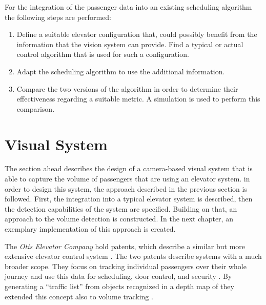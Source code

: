 For the integration of the passenger data into an existing scheduling algorithm the following steps are performed:

\begin{enumerate}
    \item Define a suitable elevator configuration that, could possibly benefit from the information that the vision system can provide. 
    Find a typical or actual control algorithm that is used for such a configuration.
    \item Adapt the scheduling algorithm to use the additional information.
    \item Compare the two versions of the algorithm in order to determine their effectiveness regarding a suitable metric.
    A simulation is used to perform this comparison.
\end{enumerate}

 
\section{Visual System}
The section ahead describes the design of a camera-based visual system that is able to capture the volume of passengers that are using an elevator system. 
in order to design this system, the approach described in the previous section is followed.
First, the integration into a typical elevator system is described, 
then the detection capabilities of the system are specified.
Building on that, an approach to the volume detection is constructed.
In the next chapter, an exemplary implementation of this approach is created.

The \emph{Otis Elevator Company} hold patents, which describe a similar but more extensive elevator control system \autocite[][]{lin2011control} \autocite[][]{xang2016trafficlist}.
The two patents describe systems with a much broader scope.
They focus on tracking individual passengers over their whole journey and use this data for scheduling, door control, and security \autocite[][]{lin2011control}. 
By generating a \enquote{traffic list} from objects recognized in a depth map of they extended this concept also to volume tracking \autocite[][]{xang2016trafficlist}.

